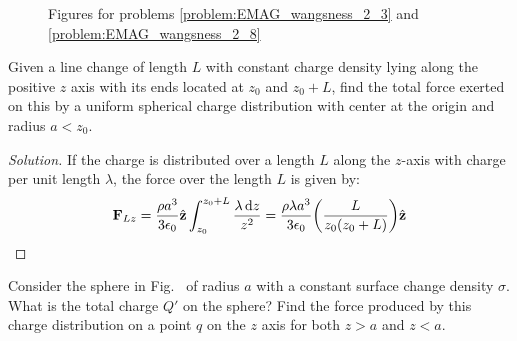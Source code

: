             \begin{figure}[H]
                \centering
                \captionsetup{type=figure}
                \begin{subfigure}[b]{0.49\textwidth}
                    \centering
                    \captionsetup{type=figure}
                    
                    \label{fig:EMAG_1_Wangsness_2_3}
                \end{subfigure}
                \begin{subfigure}[b]{0.49\textwidth}
                    \centering
                    \captionsetup{type=figure}
                    
                    \label{fig:EMAG_1_wangsness_2_8}
                \end{subfigure}
                \caption{Figures for problems \ref{problem:EMAG_wangsness_2_3}
                         and \ref{problem:EMAG_wangsness_2_8}}
                \label{fig:Figures_for_2_3_and_2_8}
            \end{figure}
            \begin{problem}[Wangsness 2-7]
                Given a line change of length $L$ with constant charge
                density lying along the positive $z$ axis with its
                ends located at $z_{0}$ and $z_{0}+L$, find the total
                force exerted on this by a uniform spherical charge
                distribution with center at the origin
                and radius $a<z_{0}$.
            \end{problem}
            \begin{proof}[Solution]
                If the charge is distributed over a length $L$
                along the $z$-axis with charge per unit length $\lambda$,
                the force over the length $L$ is given by:
                \begin{equation*}
                    \mathbf{F}_{Lz}
                    =\frac{\rho a^{3}}{3\epsilon_{0}}\hat{\mathbf{z}}
                    \int_{z_{0}}^{z_{0}+L}\frac{\lambda\mathop{}\!\mathrm{d}{z}}{z^{2}}
                    =\frac{\rho\lambda{a^{3}}}{3\epsilon_{0}}
                    \bigg(\frac{L}{z_{0}(z_{0}+L)}\bigg)
                    \hat{\mathbf{z}}
                \end{equation*}
            \end{proof}
            \begin{problem}[Wangsness 2-8]
                \label{problem:EMAG_wangsness_2_8}
                Consider the sphere in
                Fig.~
                of radius $a$ with a constant surface change density
                $\sigma$. What is the total charge $Q'$ on the sphere?
                Find the force produced by this charge distribution on a
                point $q$ on the $z$ axis for both $z>a$ and $z<a$.
            \end{problem}
